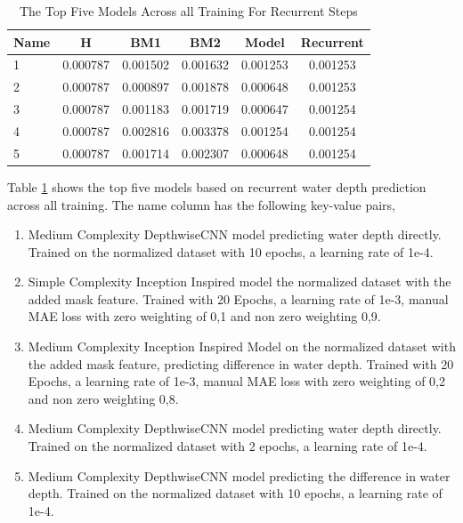 \begin{table}[htbp]
	\centering
	\caption{The Top Five Models Across all Training For Recurrent Steps}
	\label{tab:best_r}
	\begin{tabular}{p{2cm}ccccc}
		\toprule
		Name &  H &  BM1 &  BM2 &  Model &  Recurrent \\
		\midrule
		1 &       0.000787 &        0.001502 &        0.001632 &   0.001253 &            0.001253 \\
		2 &       0.000787 &        0.000897 &        0.001878 &   0.000648 &            0.001253 \\
		3 &       0.000787 &        0.001183 &        0.001719 &   0.000647 &            0.001254 \\
		4 &       0.000787 &        0.002816 &        0.003378 &   0.001254 &            0.001254 \\
		5 &       0.000787 &        0.001714 &        0.002307 &   0.000648 &            0.001254 \\
		\bottomrule
	\end{tabular}
\end{table}
Table \ref{tab:best_r} shows the top five models based on recurrent water depth prediction across all training. The name column has the following key-value pairs,
\begin{enumerate}
	\item Medium Complexity DepthwiseCNN model predicting water depth directly. Trained on the normalized dataset with 10 epochs, a learning rate of 1e-4.
	\item Simple Complexity Inception Inspired model the normalized dataset with the added mask feature. Trained with 20 Epochs, a learning rate of 1e-3, manual MAE loss with zero weighting of 0,1 and non zero weighting 0,9.
	\item Medium Complexity Inception Inspired Model on the normalized dataset with the  added mask feature, predicting difference in water depth. Trained with 20 Epochs, a learning rate of 1e-3, manual MAE loss with zero weighting of 0,2 and non zero weighting 0,8.
	\item Medium Complexity DepthwiseCNN model predicting water depth directly. Trained on the normalized dataset with 2 epochs, a learning rate of 1e-4.
	\item Medium Complexity DepthwiseCNN model predicting the difference in  water depth. Trained on the normalized dataset with 10 epochs, a learning rate of 1e-4.
\end{enumerate}

